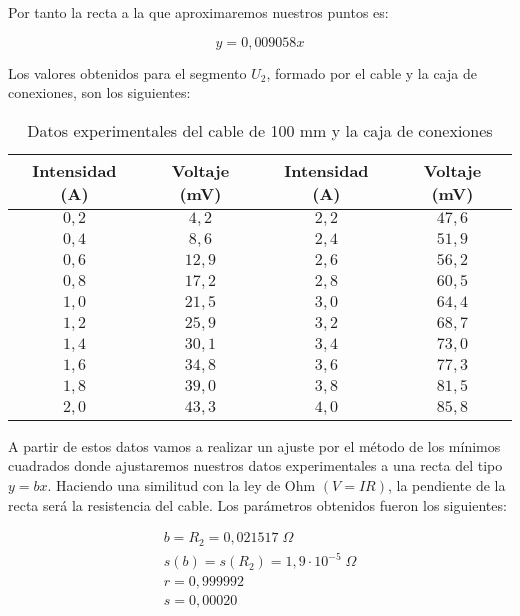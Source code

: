 \documentclass[a4paper,12pt,titlepage]{article}
\begin{document}
Por tanto la recta a la que aproximaremos nuestros puntos es:

\begin{equation}
    y = 0,009058x
\end{equation}

Los valores obtenidos para el segmento $U_{2}$, formado por el cable y la caja de conexiones, son los siguientes:

\begin{table}[h!]
    \centering
    \begin{tabular}{|c|c|c|c|}
        \hline
        Intensidad (A) & Voltaje (mV) & Intensidad (A) & Voltaje (mV) \\
        \hline
        $0,2$ & $4,2$ & $2,2$ & $47,6$ \\
        \hline
        $0,4$ & $8,6$ & $2,4$ & $51,9$ \\
        \hline
        $0,6$ & $12,9$ & $2,6$ & $56,2$ \\ 
        \hline
        $0,8$ & $17,2$ & $2,8$ & $60,5$ \\
        \hline
        $1,0$ & $21,5$ & $3,0$ & $64,4$ \\
        \hline
        $1,2$ & $25,9$ & $3,2$ & $68,7$ \\
        \hline
        $1,4$ & $30,1$ & $3,4$ & $73,0$ \\ 
        \hline
        $1,6$ & $34,8$ & $3,6$ & $77,3$ \\
        \hline
        $1,8$ & $39,0$ & $3,8$ & $81,5$ \\
        \hline
        $2,0$ & $43,3$ & $4,0$ & $85,8$ \\ 
        \hline
    \end{tabular}
    \caption{Datos experimentales del cable de 100 mm y la caja de conexiones}
\end{table}

A partir de estos datos vamos a realizar un ajuste por el método de los mínimos cuadrados donde ajustaremos nuestros datos experimentales a una recta del tipo $y=bx$. Haciendo una similitud con la ley de Ohm $(V=IR)$, la pendiente de la recta será la resistencia del cable. Los parámetros obtenidos fueron los siguientes:

\begin{equation}
    \begin{gathered}
        b = R_{2} =0,021517 \; \Omega 
        \\
        s(b) =s(R_{2})= 1,9 \cdot 10^{-5} \; \Omega
        \\
        r = 0,999992
        \\
        s = 0,00020
    \end{gathered}
\end{equation}
\end{document}
